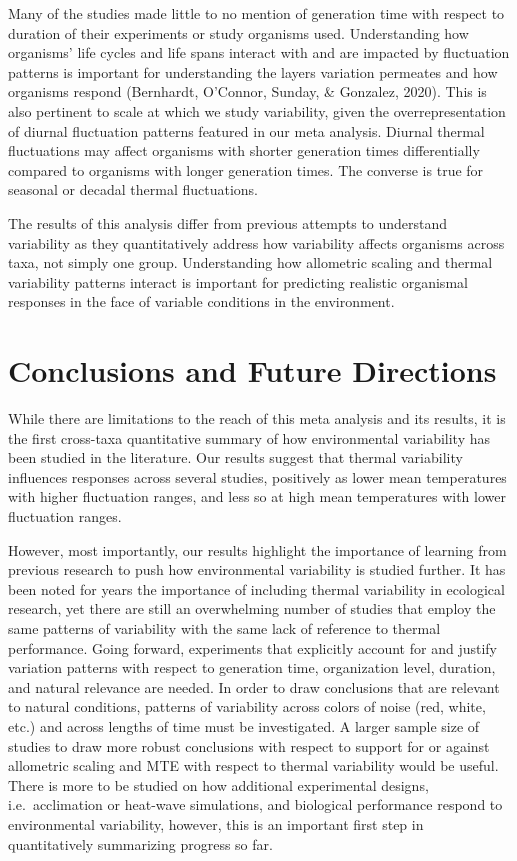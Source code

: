 \documentclass[12pt,twoside]{reedthesis}
\begin{document}
Many of the studies made little to no mention of generation time with respect to duration of their experiments or study organisms used. Understanding how organisms' life cycles and life spans interact with and are impacted by fluctuation patterns is important for understanding the layers variation permeates and how organisms respond (Bernhardt, O'Connor, Sunday, \& Gonzalez, 2020). This is also pertinent to scale at which we study variability, given the overrepresentation of diurnal fluctuation patterns featured in our meta analysis. Diurnal thermal fluctuations may affect organisms with shorter generation times differentially compared to organisms with longer generation times. The converse is true for seasonal or decadal thermal fluctuations.

The results of this analysis differ from previous attempts to understand variability as they quantitatively address how variability affects organisms across taxa, not simply one group. Understanding how allometric scaling and thermal variability patterns interact is important for predicting realistic organismal responses in the face of variable conditions in the environment.

\hypertarget{conclusions-and-future-directions}{%
\chapter*{Conclusions and Future Directions}\label{conclusions-and-future-directions}}

While there are limitations to the reach of this meta analysis and its results, it is the first cross-taxa quantitative summary of how environmental variability has been studied in the literature. Our results suggest that thermal variability influences responses across several studies, positively as lower mean temperatures with higher fluctuation ranges, and less so at high mean temperatures with lower fluctuation ranges.

However, most importantly, our results highlight the importance of learning from previous research to push how environmental variability is studied further. It has been noted for years the importance of including thermal variability in ecological research, yet there are still an overwhelming number of studies that employ the same patterns of variability with the same lack of reference to thermal performance. Going forward, experiments that explicitly account for and justify variation patterns with respect to generation time, organization level, duration, and natural relevance are needed. In order to draw conclusions that are relevant to natural conditions, patterns of variability across colors of noise (red, white, etc.) and across lengths of time must be investigated. A larger sample size of studies to draw more robust conclusions with respect to support for or against allometric scaling and MTE with respect to thermal variability would be useful. There is more to be studied on how additional experimental designs, i.e.~acclimation or heat-wave simulations, and biological performance respond to environmental variability, however, this is an important first step in quantitatively summarizing progress so far.
\end{document}
